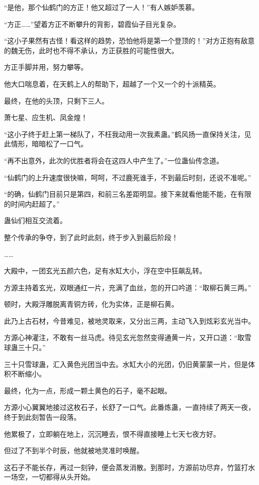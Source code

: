 \begin{this_body}
“是他，那个仙鹤门的方正！他又超过了一人！”有人嫉妒羡慕。

“方正……”望着方正不断攀升的背影，碧霞仙子目光复杂。

“这小子果然有古怪！看这样的趋势，恐怕他将是第一个登顶的！”对方正抱有敌意的魏无伤，此时也不得不承认，方正获胜的可能性很大。

方正手脚并用，努力攀等。

他大口喘息着，在天鹤上人的帮助下，超越了一个又一个的十派精英。

最终，在他的头顶，只剩下三人。

萧七星、应生机、凤金煌！

“这小子终于赶上第一梯队了，不枉我动用一次我素蛊。”鹤风扬一直保持关注，见此情形，暗暗松了一口气。

“再不出意外，此次的优胜者将会在这四人中产生了。”一位蛊仙传念道。

“仙鹤门的上升速度很快嘛，呵呵，不过鹿死谁手，不到最后时刻，还说不准呢。”

“的确，仙鹤门目前只是第四，和前三名差距明显。接下来就看他能不能，在有限的时间内赶超了。”

蛊仙们相互交流着。

整个传承的争夺，到了此时此刻，终于步入到最后阶段！

……

大殿中，一团玄光五颜六色，足有水缸大小，浮在空中狂飙乱转。

方源主持着玄光，双眼通红一片，充满了血丝，忽的开口吟道：“取柳石黄三两。”

顿时，大殿浮雕脱离青铜方砖，化为实体，正是柳石黄。

此乃上古石材，今昔难见，被地灵取来，又分出三两，主动飞入到炫彩玄光当中。

方源心神灌注，不敢有一丝马虎。待见玄光忽然变得通黄一片，又开口道：“取雪球蛊三十只。”

三十只雪球蛊，汇入黄色光团当中去。水缸大小的光团，仍旧黄蒙蒙一片，但是体积不断缩小。

最终，化为一点，形成一颗土黄色的石子，毫不起眼。

方源小心翼翼地接过这枚石子，长舒了一口气。此番炼蛊，一直持续了两天一夜，终于到此刻暂告一段落。

他累极了，立即躺在地上，沉沉睡去，恨不得直接睡上七天七夜方好。

但过了不到半个时辰，他就被地灵准时唤醒。

这石子不能长存，再过一刻钟，便会蒸发消散。到那时，方源前功尽弃，竹篮打水一场空，一切都得从头开始。


\end{this_body}
